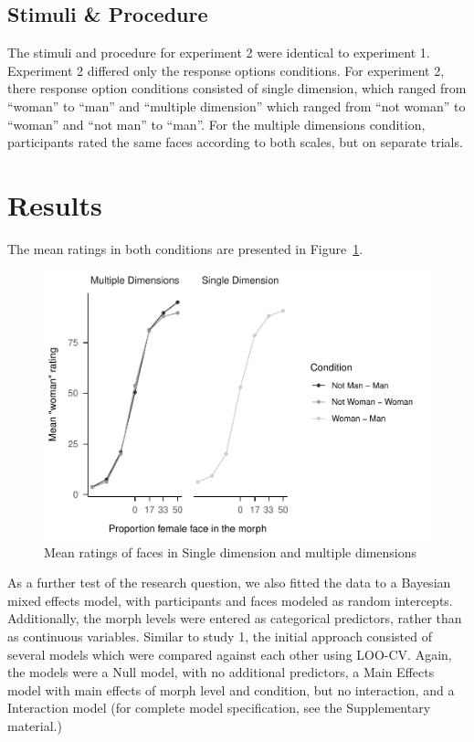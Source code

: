 \documentclass[
  man]{apa7}
\begin{document}
\hypertarget{stimuli-procedure}{%
\subsection{Stimuli \& Procedure}\label{stimuli-procedure}}

The stimuli and procedure for experiment 2 were identical to experiment 1. Experiment 2 differed only the response options conditions. For experiment 2, there response option conditions consisted of single dimension, which ranged from ``woman'' to ``man'' and ``multiple dimension'' which ranged from ``not woman'' to ``woman'' and ``not man'' to ``man''. For the multiple dimensions condition, participants rated the same faces according to both scales, but on separate trials.

\hypertarget{results-1}{%
\section{Results}\label{results-1}}

The mean ratings in both conditions are presented in Figure~\ref{fig:descriptives-two}.

\begin{figure}
\centering
\includegraphics{resp_opts_manus23022_files/figure-latex/descriptives-two-1.pdf}
\caption{\label{fig:descriptives-two}Mean ratings of faces in Single dimension and multiple dimensions}
\end{figure}

As a further test of the research question, we also fitted the data to a Bayesian mixed effects model, with participants and faces modeled as random intercepts. Additionally, the morph levels were entered as categorical predictors, rather than as continuous variables. Similar to study 1, the initial approach consisted of several models which were compared against each other using LOO-CV. Again, the models were a Null model, with no additional predictors, a Main Effects model with main effects of morph level and condition, but no interaction, and a Interaction model (for complete model specification, see the Supplementary material.)
\end{document}
